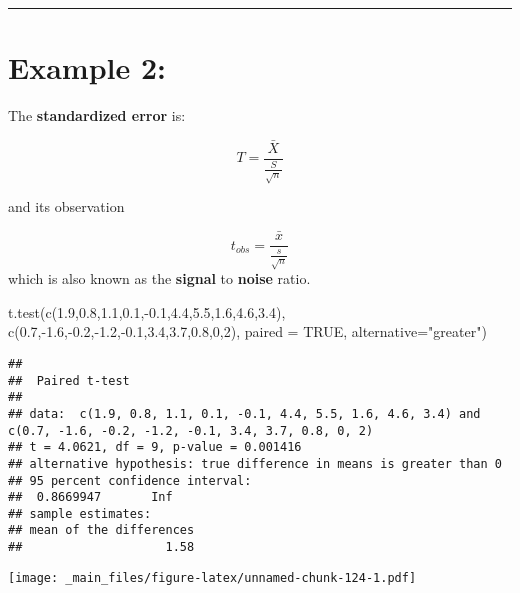 \documentclass[
]{book}
\newenvironment{Shaded}{\begin{snugshade}}{\end{snugshade}}
\newcommand{\AttributeTok}[1]{\textcolor[rgb]{0.77,0.63,0.00}{#1}}
\newcommand{\ConstantTok}[1]{\textcolor[rgb]{0.00,0.00,0.00}{#1}}
\newcommand{\DecValTok}[1]{\textcolor[rgb]{0.00,0.00,0.81}{#1}}
\newcommand{\FloatTok}[1]{\textcolor[rgb]{0.00,0.00,0.81}{#1}}
\newcommand{\FunctionTok}[1]{\textcolor[rgb]{0.00,0.00,0.00}{#1}}
\newcommand{\NormalTok}[1]{#1}
\newcommand{\SpecialCharTok}[1]{\textcolor[rgb]{0.00,0.00,0.00}{#1}}
\newcommand{\StringTok}[1]{\textcolor[rgb]{0.31,0.60,0.02}{#1}}
\begin{document}
\begin{center}\rule{0.5\linewidth}{0.5pt}\end{center}

\hypertarget{example-2-5}{%
\section{Example 2:}\label{example-2-5}}

The \textbf{standardized error} is:

\[T=\frac{\bar{X}}{\frac{S}{\sqrt{n}}}\]

and its observation

\[t_{obs}=\frac{\bar{x}}{\frac{s}{\sqrt{n}}}\]
which is also known as the \textbf{signal} to \textbf{noise} ratio.

\begin{Shaded}
\begin{Highlighting}[]
\FunctionTok{t.test}\NormalTok{(}\FunctionTok{c}\NormalTok{(}\FloatTok{1.9}\NormalTok{,}\FloatTok{0.8}\NormalTok{,}\FloatTok{1.1}\NormalTok{,}\FloatTok{0.1}\NormalTok{,}\SpecialCharTok{{-}}\FloatTok{0.1}\NormalTok{,}\FloatTok{4.4}\NormalTok{,}\FloatTok{5.5}\NormalTok{,}\FloatTok{1.6}\NormalTok{,}\FloatTok{4.6}\NormalTok{,}\FloatTok{3.4}\NormalTok{),}
       \FunctionTok{c}\NormalTok{(}\FloatTok{0.7}\NormalTok{,}\SpecialCharTok{{-}}\FloatTok{1.6}\NormalTok{,}\SpecialCharTok{{-}}\FloatTok{0.2}\NormalTok{,}\SpecialCharTok{{-}}\FloatTok{1.2}\NormalTok{,}\SpecialCharTok{{-}}\FloatTok{0.1}\NormalTok{,}\FloatTok{3.4}\NormalTok{,}\FloatTok{3.7}\NormalTok{,}\FloatTok{0.8}\NormalTok{,}\DecValTok{0}\NormalTok{,}\DecValTok{2}\NormalTok{),}
       \AttributeTok{paired =} \ConstantTok{TRUE}\NormalTok{,}
       \AttributeTok{alternative=}\StringTok{"greater"}\NormalTok{)}
\end{Highlighting}
\end{Shaded}

\begin{verbatim}
## 
##  Paired t-test
## 
## data:  c(1.9, 0.8, 1.1, 0.1, -0.1, 4.4, 5.5, 1.6, 4.6, 3.4) and c(0.7, -1.6, -0.2, -1.2, -0.1, 3.4, 3.7, 0.8, 0, 2)
## t = 4.0621, df = 9, p-value = 0.001416
## alternative hypothesis: true difference in means is greater than 0
## 95 percent confidence interval:
##  0.8669947       Inf
## sample estimates:
## mean of the differences 
##                    1.58
\end{verbatim}

\texttt{[image: \_main\_files/figure-latex/unnamed-chunk-124-1.pdf]}
\end{document}
